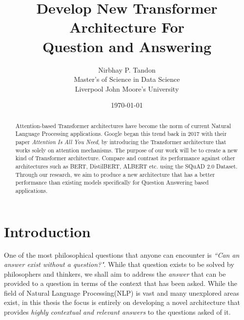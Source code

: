 \documentclass[a4paper,12pt]{report}
\begin{document}
    \title{Develop New Transformer Architecture For \\ Question and Answering}

    \author{Nirbhay P. Tandon\\ Master's of Science in Data Science\\Liverpool John Moore's University}

    \date{\vfill \monthyeardate\today}
    \maketitle


    \cleardoublepage%
    \tableofcontents
    \newpage
    \listoffigures
    \listoftables
    
    \printnomenclature[1in]
	\begin{abstract}
		Attention-based Transformer architectures have become the norm of current Natural Language Processing applications. Google began this trend back in 2017 with their paper \textit{Attention Is All You Need}, by introducing the Transformer architecture that works solely on attention mechanisms. The purpose of our work will be to create a new kind of Transformer architecture. Compare and contrast its performance against other architectures such as BERT, DistilBERT, ALBERT etc. using the SQuAD 2.0 Dataset. Through our research, we aim to produce a new architecture that has a better performance than existing models specifically for Question Answering based applications.
	\end{abstract}
    \cleardoublepage%
    \chapter{Introduction}\label{c1introduction}

    One of the most philosophical questions that anyone can encounter is \textit{``Can an answer exist without a question?"}. While that question exists to be solved by philosophers and thinkers, we shall aim to address the \textit{answer} that can be provided to a question in terms of the context that has been asked. While the field of Natural Language Processing(NLP) is vast and many unexplored areas exist, in this thesis the focus is entirely on developing a novel architecture that provides \textit{highly contextual and relevant answers} to the questions asked of it.
\end{document}
